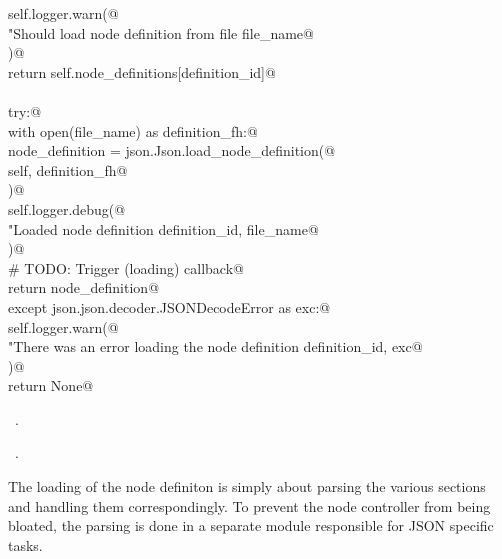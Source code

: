 \documentclass[
    a4paper,      %
    10pt,         %
    openright,    %
    notitlepage,  %
    parskip=half, %
]{scrreprt}       %
\theoremstyle{definition}                    %
\begin{document}
\begin{flushleft}
\begin{minipage}{\linewidth}
\begin{list}{}{}
\mbox{}\lstinline@        self.logger.warn(@\\
\mbox{}\lstinline@            "Should load node definition from file %s, but is already loaded",@\\
\mbox{}\lstinline@            file_name@\\
\mbox{}\lstinline@        )@\\
\mbox{}\lstinline@        return self.node_definitions[definition_id]@\\
\mbox{}\lstinline@@\\
\mbox{}\lstinline@    try:@\\
\mbox{}\lstinline@        with open(file_name) as definition_fh:@\\
\mbox{}\lstinline@            node_definition = json.Json.load_node_definition(@\\
\mbox{}\lstinline@                self, definition_fh@\\
\mbox{}\lstinline@            )@\\
\mbox{}\lstinline@            self.logger.debug(@\\
\mbox{}\lstinline@                "Loaded node definition %s from file %s",@\\
\mbox{}\lstinline@                definition_id, file_name@\\
\mbox{}\lstinline@            )@\\
\mbox{}\lstinline@            # TODO: Trigger (loading) callback@\\
\mbox{}\lstinline@            return node_definition@\\
\mbox{}\lstinline@    except json.json.decoder.JSONDecodeError as exc:@\\
\mbox{}\lstinline@        self.logger.warn(@\\
\mbox{}\lstinline@            "There was an error loading the node definition %s: %s",@\\
\mbox{}\lstinline@            definition_id, exc@\\
\mbox{}\lstinline@        )@\\
\mbox{}\lstinline@        return None@{\NWsep}
\end{list}
\vspace{-1.5ex}
\footnotesize
\begin{list}{}{\setlength{\itemsep}{-\parsep}\setlength{\itemindent}{-\leftmargin}}
\item \NWtxtMacroDefBy\ .
\item \NWtxtMacroRefIn\ .

\item{}
\end{list}
\end{minipage}\vspace{4ex}
\end{flushleft}
The loading of the node definiton is simply about parsing the various sections
and handling them correspondingly. To prevent the node controller from being
bloated, the parsing is done in a separate module responsible for JSON specific
tasks.
\end{document}
